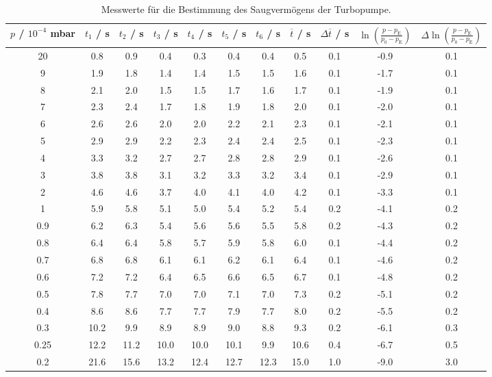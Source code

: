 \begin{table} %
  \caption{Messwerte für die Bestimmung des Saugvermögens der Turbopumpe.}
  \label{tab:ptturbo}
  \hspace{-2cm}
  \begin{tabular}{c|c|c|c|c|c|c|c|c|c|c}
    $p$ / $10^{-4}$ mbar & $t_1$ / s & $t_2$ / s & $t_3$ / s & $t_4$ / s & $t_5$ / s & $t_6$ / s & $\overline{t}$ / s & $\Delta \overline{t}$ / s & $\ln\left( \frac{p-p_\text{E}}{p_0-p_\text{E}} \right)$ & $\Delta \ln\left( \frac{p-p_\text{E}}{p_0-p_\text{E}} \right)$ \\
    \midrule
    20   & 0.8  & 0.9  & 0.4  & 0.3  & 0.4  & 0.4  & 0.5  & 0.1 & -0.9 & 0.1 \\
    9    & 1.9  & 1.8  & 1.4  & 1.4  & 1.5  & 1.5  & 1.6  & 0.1 & -1.7 & 0.1 \\
    8    & 2.1  & 2.0  & 1.5  & 1.5  & 1.7  & 1.6  & 1.7  & 0.1 & -1.9 & 0.1 \\
    7    & 2.3  & 2.4  & 1.7  & 1.8  & 1.9  & 1.8  & 2.0  & 0.1 & -2.0 & 0.1 \\
    6    & 2.6  & 2.6  & 2.0  & 2.0  & 2.2  & 2.1  & 2.3  & 0.1 & -2.1 & 0.1 \\
    5    & 2.9  & 2.9  & 2.2  & 2.3  & 2.4  & 2.4  & 2.5  & 0.1 & -2.3 & 0.1 \\
    4    & 3.3  & 3.2  & 2.7  & 2.7  & 2.8  & 2.8  & 2.9  & 0.1 & -2.6 & 0.1 \\
    3    & 3.8  & 3.8  & 3.1  & 3.2  & 3.3  & 3.2  & 3.4  & 0.1 & -2.9 & 0.1 \\
    2    & 4.6  & 4.6  & 3.7  & 4.0  & 4.1  & 4.0  & 4.2  & 0.1 & -3.3 & 0.1 \\
    \hline
    1    & 5.9  & 5.8  & 5.1  & 5.0  & 5.4  & 5.2  & 5.4  & 0.2 & -4.1 & 0.2 \\
    0.9  & 6.2  & 6.3  & 5.4  & 5.6  & 5.6  & 5.5  & 5.8  & 0.2 & -4.3 & 0.2 \\
    0.8  & 6.4  & 6.4  & 5.8  & 5.7  & 5.9  & 5.8  & 6.0  & 0.1 & -4.4 & 0.2 \\
    0.7  & 6.8  & 6.8  & 6.1  & 6.1  & 6.2  & 6.1  & 6.4  & 0.1 & -4.6 & 0.2 \\
    0.6  & 7.2  & 7.2  & 6.4  & 6.5  & 6.6  & 6.5  & 6.7  & 0.1 & -4.8 & 0.2 \\
    0.5  & 7.8  & 7.7  & 7.0  & 7.0  & 7.1  & 7.0  & 7.3  & 0.2 & -5.1 & 0.2 \\
    0.4  & 8.6  & 8.6  & 7.7  & 7.7  & 7.9  & 7.7  & 8.0  & 0.2 & -5.5 & 0.2 \\
    \hline
    0.3  & 10.2 & 9.9  & 8.9  & 8.9  & 9.0  & 8.8  & 9.3  & 0.2 & -6.1 & 0.3 \\
    0.25 & 12.2 & 11.2 & 10.0 & 10.0 & 10.1 & 9.9  & 10.6 & 0.4 & -6.7 & 0.5 \\
    0.2  & 21.6 & 15.6 & 13.2 & 12.4 & 12.7 & 12.3 & 15.0 & 1.0 & -9.0 & 3.0 \\
  \end{tabular}
\end{table}

